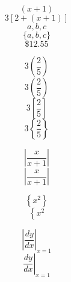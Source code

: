 \documentclass[12pt]{article}
\begin{document}
$$(x+1)$$
$$3[2+(x+1)]$$
$${a,b,c}$$
$$\{a,b,c\}$$
$$\$12.55$$

$$3(\frac{2}{5})$$
$$3\left(\frac{2}{5}\right)$$
$$3\left[\frac{2}{5}\right]$$
$$3\left\{\frac{2}{5}\right\}$$

$$|\frac{x}{x+1}|$$
$$\left|\frac{x}{x+1}\right|$$

$$\left\{x^2\right\}$$
$$\left\{x^2\right.$$

$$\left| \frac{dy}{dx} \right|_{x=1}$$
$$\left. \frac{dy}{dx} \right|_{x=1}$$
\end{document}
